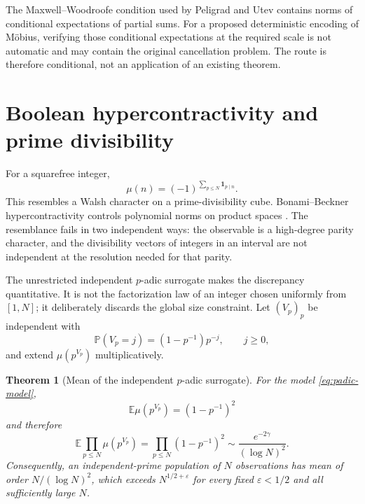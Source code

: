\documentclass[11pt]{amsart}
\numberwithin{equation}{section}
\theoremstyle{plain}
\newtheorem{theorem}{Theorem}[section]
\theoremstyle{definition}
\theoremstyle{remark}
\newcommand{\E}{\mathbb E}
\newcommand{\one}{\mathbf 1}
\newcommand{\eps}{\varepsilon}
\begin{document}
The Maxwell--Woodroofe condition used by Peligrad and Utev contains norms of
conditional expectations of partial sums.  For a proposed deterministic
encoding of M\"obius, verifying those conditional expectations at the required
scale is not automatic and may contain the original cancellation problem.
The route is therefore conditional, not an application of an existing theorem.

\section{Boolean hypercontractivity and prime divisibility}\label{sec:boolean}

For a squarefree integer,
\begin{equation}\label{eq:boolean-parity}
  \mu(n)=(-1)^{\sum_{p\leq N}\one_{p\mid n}}.
\end{equation}
This resembles a Walsh character on a prime-divisibility cube.  Bonami--Beckner
hypercontractivity controls polynomial norms on product spaces
\cite{Bonami1970,Beckner1975}.  The resemblance fails in two independent ways:
the observable is a high-degree parity character, and the divisibility vectors
of integers in an interval are not independent at the resolution needed for
that parity.

The unrestricted independent \(p\)-adic surrogate makes the discrepancy
quantitative.  It is not the factorization law of an integer chosen uniformly
from \([1,N]\); it deliberately discards the global size constraint.  Let
\((V_p)_p\) be independent with
\begin{equation}\label{eq:padic-model}
  \mathbb P(V_p=j)=(1-p^{-1})p^{-j},\qquad j\geq0,
\end{equation}
and extend \(\mu(p^{V_p})\) multiplicatively.

\begin{theorem}[Mean of the independent \(p\)-adic surrogate]\label{thm:boolean-mismatch}
For the model \eqref{eq:padic-model},
\begin{equation}\label{eq:local-expectation}
  \E\mu(p^{V_p})=(1-p^{-1})^2
\end{equation}
and therefore
\begin{equation}\label{eq:global-model-mean}
  \E\prod_{p\leq N}\mu(p^{V_p})
  =\prod_{p\leq N}(1-p^{-1})^2
  \sim \frac{e^{-2\gamma}}{(\log N)^2}.
\end{equation}
Consequently, an independent-prime population of \(N\) observations has mean
of order \(N/(\log N)^2\), which exceeds \(N^{1/2+\eps}\) for every fixed
\(\eps<1/2\) and all sufficiently large \(N\).
\end{theorem}
\end{document}
